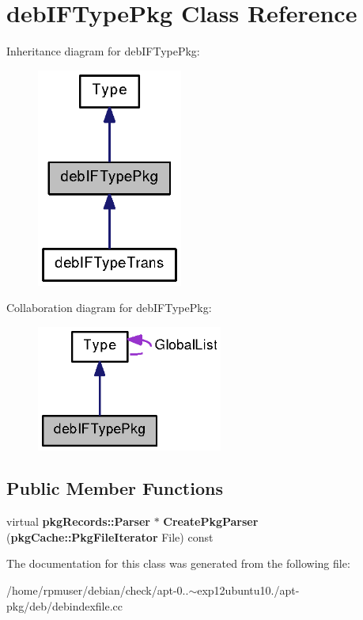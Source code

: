 \section{deb\-I\-F\-Type\-Pkg \-Class \-Reference}
\label{classdebIFTypePkg}


\-Inheritance diagram for deb\-I\-F\-Type\-Pkg\-:
\nopagebreak
\begin{figure}[H]
\begin{center}
\leavevmode
\includegraphics[width=136pt]{classdebIFTypePkg__inherit__graph}
\end{center}
\end{figure}


\-Collaboration diagram for deb\-I\-F\-Type\-Pkg\-:
\nopagebreak
\begin{figure}[H]
\begin{center}
\leavevmode
\includegraphics[width=173pt]{classdebIFTypePkg__coll__graph}
\end{center}
\end{figure}
\subsection*{\-Public \-Member \-Functions}
\begin{DoxyCompactItemize}
\item 
virtual {\bf pkg\-Records\-::\-Parser} $\ast$ {\bfseries \-Create\-Pkg\-Parser} ({\bf pkg\-Cache\-::\-Pkg\-File\-Iterator} \-File) const \label{classdebIFTypePkg_a5c7bfcd901abdb70ec482bc768d0d7fa}

\end{DoxyCompactItemize}


\-The documentation for this class was generated from the following file\-:\begin{DoxyCompactItemize}
\item 
/home/rpmuser/debian/check/apt-\/0..$\sim$exp12ubuntu10./apt-\/pkg/deb/debindexfile.\-cc\end{DoxyCompactItemize}
